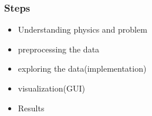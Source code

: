 \begin{frame}\frametitle{Steps}
\begin{itemize}
\item Understanding physics and problem
\item preprocessing the data
\item exploring the data(implementation)
\item visualization(GUI)
\item Results
\end{itemize}
\end{frame}



%